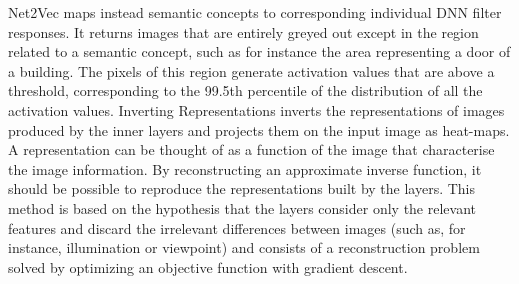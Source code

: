 \documentclass[final,1p,times]{elsarticle}
\begin{document}
Net2Vec \cite{fong2018net2vec} maps instead semantic concepts to corresponding individual DNN filter responses. It returns images that are entirely greyed out except in the region related to a semantic concept, such as for instance the area representing a door of a building. The pixels of this region generate activation values that are above a threshold, corresponding to the 99.5th percentile of the distribution of all the activation values.
Inverting Representations \cite{mahendran2015understanding} inverts the representations of images produced by the inner layers and projects them on the input image as heat-maps. A representation can be thought of as a function of the image that characterise the image information. By reconstructing an approximate inverse function, it should be possible to reproduce the representations built by the layers. This method is based on the hypothesis that the layers consider only the relevant features and discard the irrelevant differences between images (such as, for instance, illumination or viewpoint) and consists of a reconstruction problem solved by optimizing an objective function with gradient descent. \\
\end{document}
